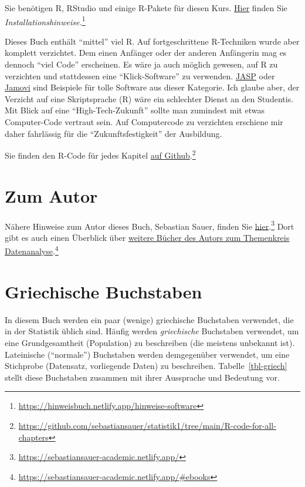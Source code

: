 \documentclass[
  a4paper,
]{scrbook}
\theoremstyle{definition}
\theoremstyle{definition}
\theoremstyle{definition}
\theoremstyle{remark}
\begin{document}
Sie benötigen R, RStudio und einige R-Pakete für diesen Kurs.
\href{https://hinweisbuch.netlify.app/hinweise-software}{Hier} finden
Sie \emph{Installationshinweise.}\footnote{\url{https://hinweisbuch.netlify.app/hinweise-software}}

Dieses Buch enthält ``mittel'' viel R. Auf fortgeschrittene R-Techniken
wurde aber komplett verzichtet. Dem einen Anfänger oder der anderen
Anfängerin mag es dennoch ``viel Code'' erscheinen. Es wäre ja auch
möglich gewesen, auf R zu verzichten und stattdessen eine
``Klick-Software'' zu verwenden. \href{https://jasp-stats.org/}{JASP}
oder \href{https://www.jamovi.org/}{Jamovi} sind Beispiele für tolle
Software aus dieser Kategorie. Ich glaube aber, der Verzicht auf eine
Skriptsprache (R) wäre ein schlechter Dienst an den Studentis. Mit Blick
auf eine ``High-Tech-Zukunft'' sollte man zumindest mit etwas
Computer-Code vertraut sein. Auf Computercode zu verzichten erschiene
mir daher fahrlässig für die ``Zukunftsfestigkeit'' der Ausbildung.

Sie finden den R-Code für jedes Kapitel
\href{https://github.com/sebastiansauer/statistik1/tree/main/R-code-for-all-chapters}{auf
Github}.\footnote{\url{https://github.com/sebastiansauer/statistik1/tree/main/R-code-for-all-chapters}}

\section{Zum Autor}\label{zum-autor}

Nähere Hinweise zum Autor dieses Buch, Sebastian Sauer, finden Sie
\href{https://sebastiansauer-academic.netlify.app/}{hier}.\footnote{\url{https://sebastiansauer-academic.netlify.app/}}
Dort gibt es auch einen Überblick über
\href{https://sebastiansauer-academic.netlify.app/\#ebooks}{weitere
Bücher des Autors zum Themenkreis Datenanalyse}.\footnote{\url{https://sebastiansauer-academic.netlify.app/\#ebooks}}

\section{Griechische Buchstaben}\label{sec-greek}

In diesem Buch werden ein paar (wenige) griechische Buchstaben
verwendet, die in der Statistik üblich sind. Häufig werden
\emph{griechische} Buchstaben verwendet, um eine Grundgesamtheit
(Population) zu beschreiben (die meistens unbekannt ist). Lateinische
(``normale'') Buchstaben werden demgegenüber verwendet, um eine
Stichprobe (Datensatz, vorliegende Daten) zu beschreiben.
Tabelle~\ref{tbl-griech} stellt diese Buchstaben zusammen mit ihrer
Aussprache und Bedeutung vor.
\end{document}
